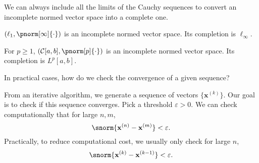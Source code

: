 \documentclass{huhtakm-template-book-v2}
\begin{document}
    \begin{rem}
    	We can always include all the limits of the Cauchy sequences to convert an incomplete normed vector space into a complete one.
    \end{rem}
    \begin{eg}
        $(\ell_{1}, \pnorm[\infty]{\cdot})$ is an incomplete normed vector space. Its completion is $\ell_{\infty}$.
    \end{eg}
    \begin{eg}
        For $p \geq 1$, $(\mathcal{C}[a, b], \pnorm[p]{\cdot})$ is an incomplete normed vector space. Its completion is $L^{p}[a, b]$.
    \end{eg}
    In practical cases, how do we check the convergence of a given sequence?
    \begin{eg}
        From an iterative algorithm, we generate a sequence of vectors $\{\mathbf{x}^{(k)}\}$. Our goal is to check if this sequence converges. Pick a threshold $\varepsilon > 0$. We can check computationally that for large $n, m$,
        \begin{equation*}
            \snorm{\mathbf{x}^{(n)} - \mathbf{x}^{(m)}} < \varepsilon.
        \end{equation*}
        Practically, to reduce computational cost, we usually only check for large $n$,
        \begin{equation*}
            \snorm{\mathbf{x}^{(k)} - \mathbf{x}^{(k-1)}} < \varepsilon.
        \end{equation*}
    \end{eg}
    \newpage
\end{document}
